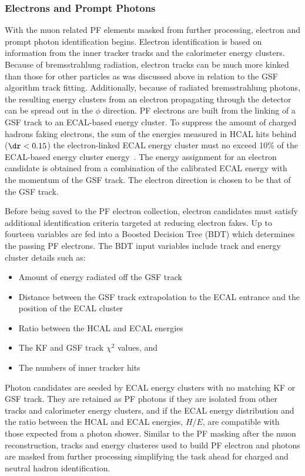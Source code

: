 \subsubsection{Electrons and Prompt Photons}
With the muon related PF elements masked from further processing, electron and prompt photon
identification begins.
Electron identification is based on information from the inner tracker tracks and the calorimeter
energy clusters. Because of bremsstrahlung radiation, electron tracks can be much more kinked
than those for other particles as was discussed above in relation to the GSF algorithm track
fitting. Additionally, because of radiated bremsstrahlung photons, the resulting energy clusters 
from an electron propagating through the detector can be spread out in the
$\phi$ direction. PF electrons are built from the linking of a GSF track to an
ECAL-based energy cluster. To suppress the amount of charged hadrons faking electrons, the 
sum of the energies measured in HCAL hits behind ($\dr < 0.15$) 
the electron-linked ECAL energy cluster must no exceed 10\% of the ECAL-based 
energy cluster energy~\cite{Sirunyan:2017ulk}. The energy assignment for an electron candidate is obtained from a 
combination of the calibrated ECAL energy with the momentum of the GSF track. The electron 
direction is chosen to be that of the GSF track.

Before being saved to the PF electron collection, electron candidates must satisfy additional
identification criteria targeted at reducing electron fakes. Up to fourteen variables are
fed into a Boosted Decision Tree (BDT) which determines the passing PF electrons. The BDT
input variables include track and energy cluster details such as:
\begin{itemize}
\item Amount of energy radiated off the GSF track
\item Distance between the GSF track extrapolation to the ECAL entrance and the position of the ECAL cluster
\item Ratio between the HCAL and ECAL energies
\item The KF and GSF track $\chi^2$ values, and
\item The numbers of inner tracker hits
\end{itemize}

Photon candidates are seeded by ECAL energy clusters with no matching KF or GSF track.
They are retained as PF photons if they are isolated from other tracks and calorimeter energy clusters, 
and if the ECAL energy distribution and the ratio between the HCAL and ECAL energies, $H/E$, are 
compatible with those expected from a photon shower. Similar to the PF masking after the muon 
reconstruction, tracks and energy clusteres used to
build PF electron and photons are masked from further processing simplifying the task ahead
for charged and neutral hadron identification.

